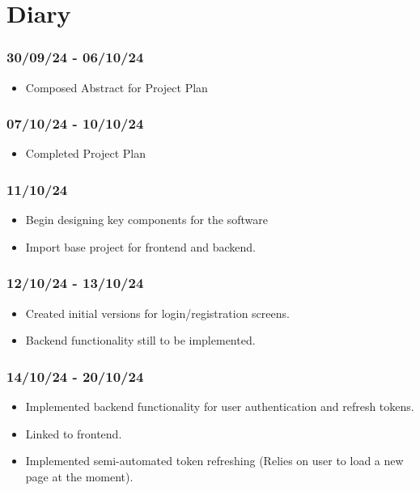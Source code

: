 \documentclass[]{final_report}
\begin{document}
\section*{Diary}

\subsubsection*{30/09/24 - 06/10/24}
\begin{itemize}
    \item Composed Abstract for Project Plan
\end{itemize}

\subsubsection*{07/10/24 - 10/10/24}
\begin{itemize}
    \item Completed Project Plan
\end{itemize}

\subsubsection*{11/10/24}
\begin{itemize}
    \item Begin designing key components for the software
    \item Import base project for frontend and backend.
\end{itemize}

\subsubsection*{12/10/24 - 13/10/24}
\begin{itemize}
    \item Created initial versions for login/registration screens.
    \item Backend functionality still to be implemented. 
\end{itemize}

\subsubsection*{14/10/24 - 20/10/24}
\begin{itemize}
    \item Implemented backend functionality for user authentication and refresh tokens. 
    \item Linked to frontend. 
    \item Implemented semi-automated token refreshing (Relies on user to load a new page at the moment).
\end{itemize}
\end{document}
